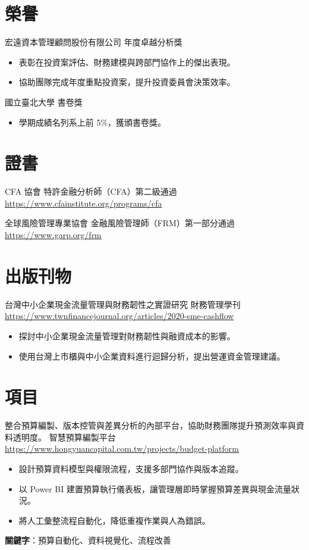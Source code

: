 \documentclass[a4paper, serif, 10pt]{moderncv}
\begin{document}
\section{榮譽}

        {宏遠資本管理顧問股份有限公司}
        {年度卓越分析獎}
        {}
        {}
        {\begin{itemize}
\item 表彰在投資案評估、財務建模與跨部門協作上的傑出表現。
\item 協助團隊完成年度重點投資案，提升投資委員會決策效率。
\end{itemize}}

        {國立臺北大學}
        {書卷獎}
        {}
        {}
        {\begin{itemize}
\item 學期成績名列系上前 5\%，獲頒書卷獎。
\end{itemize}}
\section{證書}

        {CFA 協會}
        {特許金融分析師（CFA）第二級通過}
        {\url{https://www.cfainstitute.org/programs/cfa}}
        {}
        {}

        {全球風險管理專業協會}
        {金融風險管理師（FRM）第一部分通過}
        {\url{https://www.garp.org/frm}}
        {}
        {}
\section{出版刊物}

        {台灣中小企業現金流量管理與財務韌性之實證研究}
        {財務管理學刊}
        {\url{https://www.twnfinancejournal.org/articles/2020-sme-cashflow}}
        {}
        {\begin{itemize}
\item 探討中小企業現金流量管理對財務韌性與融資成本的影響。
\item 使用台灣上市櫃與中小企業資料進行迴歸分析，提出營運資金管理建議。
\end{itemize}}
\section{項目}

        {整合預算編製、版本控管與差異分析的內部平台，協助財務團隊提升預測效率與資料透明度。}
        {智慧預算編製平台}
        {\url{https://www.hongyuancapital.com.tw/projects/budget-platform}}
        {}
        {\begin{itemize}
\item 設計預算資料模型與權限流程，支援多部門協作與版本追蹤。
\item 以 Power BI 建置預算執行儀表板，讓管理層即時掌握預算差異與現金流量狀況。
\item 將人工彙整流程自動化，降低重複作業與人為錯誤。
\end{itemize}
\textbf{關鍵字}：預算自動化、資料視覺化、流程改善}
\end{document}
